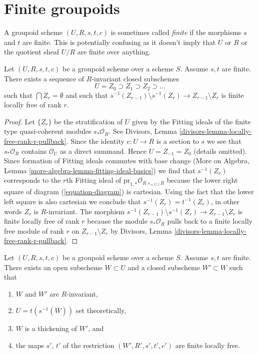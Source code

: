 \section{Finite groupoids}
\label{section-finite-groupoids}

\noindent
A groupoid scheme $(U, R, s, t, c)$ is sometimes called {\it finite} if the
morphisms $s$ and $t$ are finite. This is potentially confusing as it doesn't
imply that $U$ or $R$ or the quotient sheaf $U/R$ are finite over anything.

\begin{lemma}
\label{lemma-finite-stratify}
Let $(U, R, s, t, c)$ be a groupoid scheme over a scheme $S$. Assume $s, t$
are finite. There exists a sequence of $R$-invariant closed subschemes
$$
U = Z_0 \supset Z_1 \supset Z_2 \supset \ldots
$$
such that $\bigcap Z_r = \emptyset$ and such that
$s^{-1}(Z_{r - 1}) \setminus s^{-1}(Z_r) \to Z_{r - 1} \setminus Z_r$
is finite locally free of rank $r$.
\end{lemma}

\begin{proof}
Let $\{Z_r\}$ be the stratification of $U$ given by the Fitting ideals
of the finite type quasi-coherent modules $s_*\mathcal{O}_R$. See
Divisors, Lemma \ref{divisors-lemma-locally-free-rank-r-pullback}.
Since the identity $e : U \to R$ is a section to $s$ we see that
$s_*\mathcal{O}_R$ contains $\mathcal{O}_U$ as a direct summand.
Hence $U = Z_{-1} = Z_0$ (details omitted).
Since formation of Fitting ideals commutes with base change
(More on Algebra, Lemma \ref{more-algebra-lemma-fitting-ideal-basics})
we find that $s^{-1}(Z_r)$ corresponds to the $r$th Fitting ideal
of $\text{pr}_{1, *}\mathcal{O}_{R \times_{s, U, t} R}$ because
the lower right square of diagram (\ref{equation-diagram}) is cartesian.
Using the fact that the lower left square is also cartesian we conclude
that $s^{-1}(Z_r) = t^{-1}(Z_r)$, in other words $Z_r$ is $R$-invariant.
The morphism
$s^{-1}(Z_{r - 1}) \setminus s^{-1}(Z_r) \to Z_{r - 1} \setminus Z_r$
is finite locally free of rank $r$ because the module
$s_*\mathcal{O}_R$ pulls back to a finite locally free module of rank $r$
on $Z_{r - 1} \setminus Z_r$ by
Divisors, Lemma \ref{divisors-lemma-locally-free-rank-r-pullback}.
\end{proof}

\begin{lemma}
\label{lemma-finite-flat-over-almost-dense-subscheme}
Let $(U, R, s, t, c)$ be a groupoid scheme over a scheme $S$. Assume $s, t$
are finite. There exists an open subscheme $W \subset U$ and a closed
subscheme $W' \subset W$ such that
\begin{enumerate}
\item $W$ and $W'$ are $R$-invariant,
\item $U = t(s^{-1}(\overline{W}))$ set theoretically,
\item $W$ is a thickening of $W'$, and
\item the maps $s'$, $t'$ of the restriction $(W', R', s', t', c')$
are finite locally free.
\end{enumerate}
\end{lemma}

